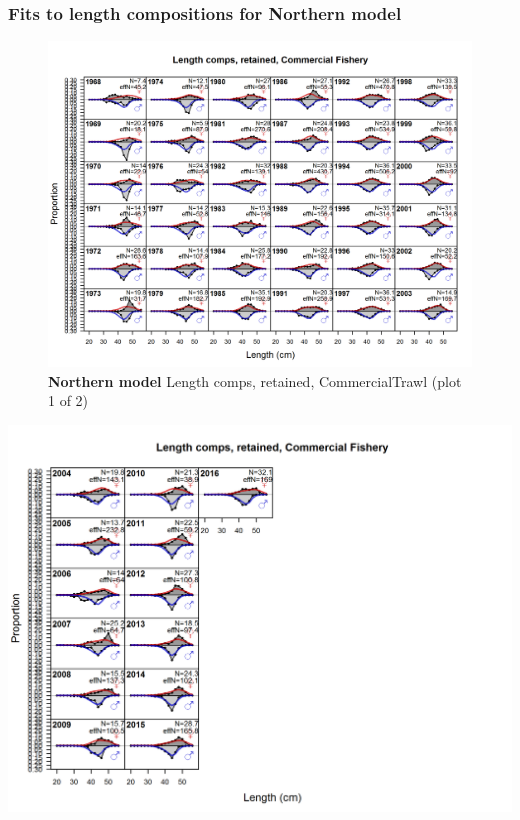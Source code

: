 \documentclass[12pt,]{article}
\begin{document}
\FloatBarrier 

\subsubsection{Fits to length compositions for Northern
model}\label{fits-to-length-compositions-for-northern-model}

\begin{figure}[htbp]
\centering
\includegraphics{./r4ss/plots_mod1/comp_lenfit_flt1mkt2_page1.png}
\caption{\textbf{Northern model} Length comps, retained, CommercialTrawl
(plot 1 of 2) \label{fig:mod1_1_comp_lenfit_flt1mkt2_page1}}
\end{figure}

\includegraphics{./r4ss/plots_mod1/comp_lenfit_flt1mkt2_page2.png}
\end{document}
